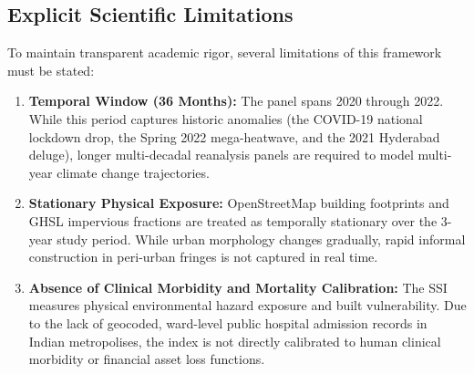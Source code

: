 \subsection{Explicit Scientific Limitations}
To maintain transparent academic rigor, several limitations of this framework must be stated:
\begin{enumerate}
    \item \textbf{Temporal Window (36 Months):} The panel spans 2020 through 2022. While this period captures historic anomalies (the COVID-19 national lockdown drop, the Spring 2022 mega-heatwave, and the 2021 Hyderabad deluge), longer multi-decadal reanalysis panels are required to model multi-year climate change trajectories.
    \item \textbf{Stationary Physical Exposure:} OpenStreetMap building footprints and GHSL impervious fractions are treated as temporally stationary over the 3-year study period. While urban morphology changes gradually, rapid informal construction in peri-urban fringes is not captured in real time.
    \item \textbf{Absence of Clinical Morbidity and Mortality Calibration:} The SSI measures physical environmental hazard exposure and built vulnerability. Due to the lack of geocoded, ward-level public hospital admission records in Indian metropolises, the index is not directly calibrated to human clinical morbidity or financial asset loss functions.
\end{enumerate}

